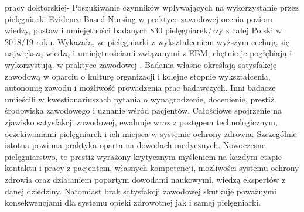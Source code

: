 \documentclass[a4paper,12pt,twoside,openany]{report}
\begin{document}
pracy doktorskiej- Poszukiwanie czynników wpływających na wykorzystanie przez pielęgniarki Evidence-Based Nursing w praktyce zawodowej ocenia poziom wiedzy, postaw i umiejętności badanych 830 pielęgniarek/rzy z całej Polski  w 2018/19 roku. Wykazała, ze pielęgniarki z wykształceniem wyższym cechują się największą wiedzą i umiejętnościami związanymi z EBM, chętnie je  pogłębiają i wykorzystują. w praktyce zawodowej \cite{ EBM}. Badania własne określają satysfakcję zawodową w oparciu o kulturę organizacji i kolejne stopnie wykształcenia, autonomię zawodu i możliwość prowadzenia prac badawczych. Inni badacze umieścili w kwestionariuszach pytania o wynagrodzenie, docenienie, prestiż środowiska zawodowego i uznanie wśród pacjentów. Całościowe spojrzenie na zjawisko satysfakcji zawodowej, ewaluuje wraz z postępem technologicznym, oczekiwaniami pielęgniarek i ich miejsca w systemie ochrony zdrowia. Szczególnie istotna powinna praktyka oparta na dowodach medycznych. Nowoczesne pielęgniarstwo, to prestiż wyrażony krytycznym myśleniem na każdym etapie kontaktu i pracy z pacjentem, własnych kompetencji, możliwości systemu ochrony zdrowia oraz działaniem popartym dowodami naukowymi, wiedzą ekspertów z danej dziedziny. Natomiast brak satysfakcji zawodowej skutkuje poważnymi konsekwencjami dla systemu opieki zdrowotnej jak i samej pielęgniarki.
\end{document}
